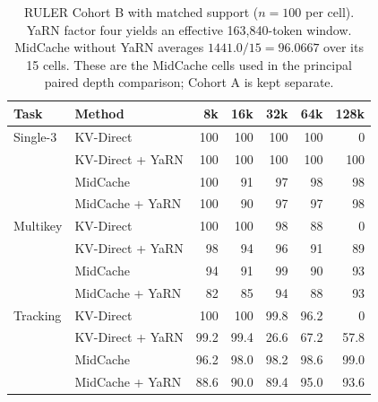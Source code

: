 \begin{table}[htbp]
\centering
\small
\setlength{\tabcolsep}{4pt}
\begin{tabular}{@{}llrrrrr@{}}
\toprule
Task & Method & 8k & 16k & 32k & 64k & 128k \\
\midrule
Single-3 & KV-Direct & 100 & 100 & 100 & 100 & 0 \\
 & KV-Direct + YaRN & 100 & 100 & 100 & 100 & 100 \\
 & MidCache & 100 & 91 & 97 & 98 & 98 \\
 & MidCache + YaRN & 100 & 90 & 97 & 97 & 98 \\
\midrule
Multikey & KV-Direct & 100 & 100 & 98 & 88 & 0 \\
 & KV-Direct + YaRN & 98 & 94 & 96 & 91 & 89 \\
 & MidCache & 94 & 91 & 99 & 90 & 93 \\
 & MidCache + YaRN & 82 & 85 & 94 & 88 & 93 \\
\midrule
Tracking & KV-Direct & 100 & 100 & 99.8 & 96.2 & 0 \\
 & KV-Direct + YaRN & 99.2 & 99.4 & 26.6 & 67.2 & 57.8 \\
 & MidCache & 96.2 & 98.0 & 98.2 & 98.6 & 99.0 \\
 & MidCache + YaRN & 88.6 & 90.0 & 89.4 & 95.0 & 93.6 \\
\bottomrule
\end{tabular}
\caption{RULER Cohort B with matched support ($n=100$ per cell). YaRN factor four yields an effective 163,840-token window. MidCache without YaRN averages $1441.0/15=96.0667$ over its 15 cells. These are the MidCache cells used in the principal paired depth comparison; Cohort A is kept separate.}
\label{tab:ruler-b}
\end{table}
